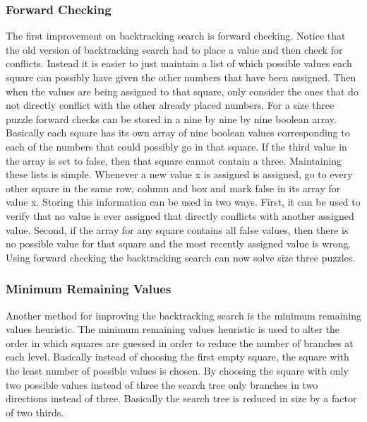 \documentclass[fleqn,10pt]{SelfArx}
\begin{document}
\subsubsection{Forward Checking}
The first improvement on backtracking search is forward checking. Notice that the old
version of backtracking search had to place a value and then check for conflicts. Instead it is easier
to just maintain a list of which possible values each square can possibly have given the other
numbers that have been assigned. Then when the values are being assigned to that square, only
consider the ones that do not directly conflict with the other already placed numbers. For a size
three puzzle forward checks can be stored in a nine by nine by nine boolean array. Basically each
square has its own array of nine boolean values corresponding to each of the numbers that could
possibly go in that square. If the third value in the array is set to false, then that square cannot
contain a three. Maintaining these lists is simple. Whenever a new value x is assigned is assigned,
go to every other square in the same row, column and box and mark false in its array for value x.
Storing this information can be used in two ways. First, it can be used to verify that no value is ever
assigned that directly conflicts with another assigned value. Second, if the array for any square
contains all false values, then there is no possible value for that square and the most recently
assigned value is wrong. Using forward checking the backtracking search can now solve size three
puzzles.
\subsubsection{Minimum Remaining Values}
Another method for improving the backtracking search is the minimum remaining values
heuristic. The minimum remaining values heuristic is used to alter the
order in which squares are guessed in order to reduce the number of branches at each level.
Basically instead of choosing the first empty square, the square with the least number of possible
values is chosen. By choosing the square with only two possible values instead of three the search tree only
branches in two directions instead of three. Basically the search tree is reduced in size by a factor of
two thirds.
\end{document}
